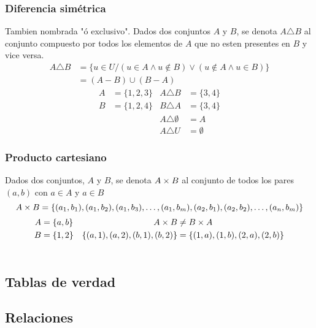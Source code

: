 \documentclass[../teoria.root.tex]{subfiles}
\begin{document}
\subsubsection{Diferencia simétrica}
Tambien nombrada "ó exclusivo". Dados dos conjuntos $A$ y $B$, se denota $A \triangle B$
al conjunto compuesto por todos los elementos de $A$ que no esten presentes en $B$ y vice versa.
\begin{align*}
    A \triangle B & = \{u \in U / (u \in A \land u \notin B) \lor (u \notin A \land u \in B) \} \\
                  & = (A - B) \cup (B - A)
\end{align*}
\begin{align*}
    A & = \{1, 2, 3\} & A \triangle B         & = \{3, 4\}  \\
    B & = \{1, 2, 4\} & B \triangle A         & = \{3, 4\}  \\
      &               & A \triangle \emptyset & = A         \\
      &               & A \triangle U         & = \emptyset
\end{align*}
\subsubsection{Producto cartesiano}
Dados dos conjuntos, $A$ y $B$, se denota $A \times B$ al conjunto de todos los pares $(a, b)$ con $a \in A$ y $a \in B$
\[ A \times B = \{(a_1, b_1), (a_1, b_2), (a_1, b_3), \dots, (a_1, b_m), (a_2, b_1), (a_2, b_2), \dots, (a_n, b_m)\} \]
\begin{align*}
    A & = \{a, b\} & A \times B                             & \neq B \times A                          \\
    B & = \{1, 2\} & \{(a, 1), (a, 2), (b, 1), (b, 2)\} & = \{(1, a), (1, b), (2, a), (2, b)\} \\
      &            &
\end{align*}

\subsection{Tablas de verdad}
\subsection{Relaciones}
\end{document}
